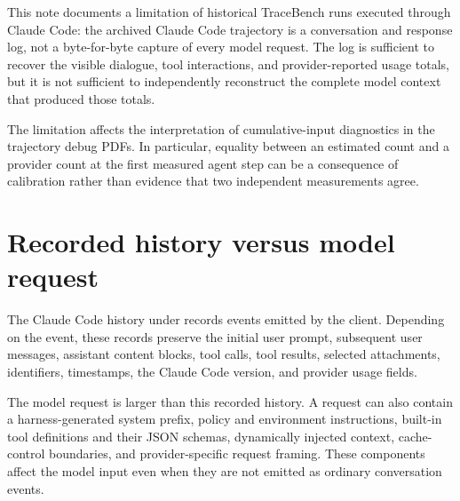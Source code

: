 \documentclass[11pt]{article}
\begin{document}
\label{docstart:claude_code_context_accounting}

This note documents a limitation of historical TraceBench runs executed through
Claude Code: the archived Claude Code trajectory is a conversation and response
log, not a byte-for-byte capture of every model request.  The log is sufficient
to recover the visible dialogue, tool interactions, and provider-reported usage
totals, but it is not sufficient to independently reconstruct the complete model
context that produced those totals.

The limitation affects the interpretation of cumulative-input diagnostics in the
trajectory debug PDFs.  In particular, equality between an estimated count and a
provider count at the first measured agent step can be a consequence of
calibration rather than evidence that two independent measurements agree.


\section*{Recorded history versus model request}

The Claude Code history under
 records events emitted by the client.
Depending on the event, these records preserve the initial user prompt, subsequent
user messages, assistant content blocks, tool calls, tool results, selected
attachments, identifiers, timestamps, the Claude Code version, and provider usage
fields.

The model request is larger than this recorded history.  A request can also
contain a harness-generated system prefix, policy and environment instructions,
built-in tool definitions and their JSON schemas, dynamically injected context,
cache-control boundaries, and provider-specific request framing.  These
components affect the model input even when they are not emitted as ordinary
conversation events.
\end{document}
